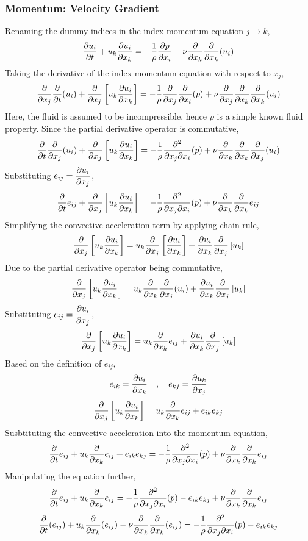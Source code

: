 \documentclass[a4paper, 12pt]{report}
\begin{document}
\begin{center}
\subsubsection{Momentum: Velocity Gradient}
\begin{comment}
\end{comment}
Renaming the dummy indices in the index momentum equation $j\to k$,
$$\frac{\partial u_i}{\partial t} + u_k\frac{\partial u_i}{\partial x_k} = -\frac{1}{\rho}\frac{\partial p}{\partial x_i} + \nu\frac{\partial}{\partial x_k}\frac{\partial}{\partial x_k}(u_i)$$
Taking the derivative of the index momentum equation with respect to $x_j$,
$$\frac{\partial}{\partial x_j}\frac{\partial}{\partial t}(u_i) + \frac{\partial}{\partial x_j}\left[u_k\frac{\partial u_i}{\partial x_k}\right] = -\frac{1}{\rho}\frac{\partial}{\partial x_j}\frac{\partial }{\partial x_i}(p) + \nu\frac{\partial}{\partial x_j}\frac{\partial}{\partial x_k}\frac{\partial}{\partial x_k}(u_i)$$
Here, the fluid is assumed to be incompressible, hence $\rho$ is a simple known fluid property. Since the partial derivative operator is commutative,
$$\frac{\partial}{\partial t}\frac{\partial}{\partial x_j}(u_i) + \frac{\partial}{\partial x_j}\left[u_k\frac{\partial u_i}{\partial x_k}\right] = -\frac{1}{\rho}\frac{\partial^2}{\partial x_j\partial x_i}(p) + \nu\frac{\partial}{\partial x_k}\frac{\partial}{\partial x_k}\frac{\partial}{\partial x_j}(u_i)$$
Substituting $\displaystyle{e_{ij}=\frac{\partial u_i}{\partial x_j}}$,
$$\frac{\partial}{\partial t}e_{ij} + \frac{\partial}{\partial x_j}\left[u_k\frac{\partial u_i}{\partial x_k}\right] = -\frac{1}{\rho}\frac{\partial^2}{\partial x_j\partial x_i}(p) + \nu\frac{\partial}{\partial x_k}\frac{\partial}{\partial x_k}e_{ij}$$
Simplifying the convective acceleration term by applying chain rule,
$$\frac{\partial}{\partial x_j}\left[u_k\frac{\partial u_i}{\partial x_k}\right] = u_k\frac{\partial}{\partial x_j}\left[\frac{\partial u_i}{\partial x_k}\right] + \frac{\partial u_i}{\partial x_k}\frac{\partial}{\partial x_j}\left[u_k\right]$$
Due to the partial derivative operator being commutative,
$$\frac{\partial}{\partial x_j}\left[u_k\frac{\partial u_i}{\partial x_k}\right] = u_k\frac{\partial }{\partial x_k}\frac{\partial}{\partial x_j}(u_i) + \frac{\partial u_i}{\partial x_k}\frac{\partial}{\partial x_j}\left[u_k\right]$$
Substituting $\displaystyle{e_{ij}=\frac{\partial u_i}{\partial x_j}}$,
$$\frac{\partial}{\partial x_j}\left[u_k\frac{\partial u_i}{\partial x_k}\right] = u_k\frac{\partial }{\partial x_k}e_{ij} + \frac{\partial u_i}{\partial x_k}\frac{\partial}{\partial x_j}\left[u_k\right]$$
Based on the definition of $e_{ij}$,
$$e_{ik} = \frac{\partial u_i}{\partial x_k} \quad,\quad e_{kj} = \frac{\partial u_k}{\partial x_j}$$
$$\frac{\partial}{\partial x_j}\left[u_k\frac{\partial u_i}{\partial x_k}\right] = u_k\frac{\partial }{\partial x_k}e_{ij} + e_{ik}e_{kj}$$
Susbtituting the convective acceleration into the momentum equation,
$$\frac{\partial}{\partial t}e_{ij} + u_k\frac{\partial }{\partial x_k}e_{ij} + e_{ik}e_{kj} = -\frac{1}{\rho}\frac{\partial^2}{\partial x_j\partial x_i}(p) + \nu\frac{\partial}{\partial x_k}\frac{\partial}{\partial x_k}e_{ij}$$
Manipulating the equation further,
$$\frac{\partial}{\partial t}e_{ij} + u_k\frac{\partial }{\partial x_k}e_{ij} = -\frac{1}{\rho}\frac{\partial^2}{\partial x_j\partial x_i}(p) - e_{ik}e_{kj} + \nu\frac{\partial}{\partial x_k}\frac{\partial}{\partial x_k}e_{ij}$$
$$\frac{\partial}{\partial t}(e_{ij}) + u_k\frac{\partial }{\partial x_k}(e_{ij}) - \nu\frac{\partial}{\partial x_k}\frac{\partial}{\partial x_k}(e_{ij}) = -\frac{1}{\rho}\frac{\partial^2}{\partial x_j\partial x_i}(p) - e_{ik}e_{kj}$$

\end{center}
\end{document}
